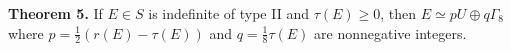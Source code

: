 \textbf{Theorem 5.} If $E \in S$ is indefinite of type II and $\tau(E) \geq 0$, then $E \simeq pU \oplus q\Gamma_8$ where $p = \frac{1}{2}(r(E) - \tau(E))$ and $q = \frac{1}{8}\tau(E)$ are nonnegative integers.
